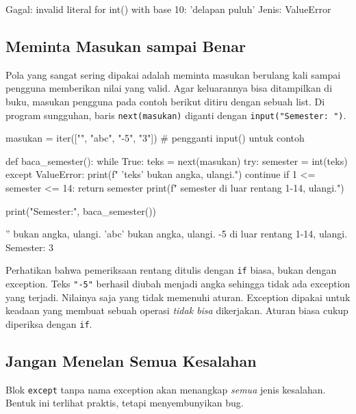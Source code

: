\begin{keluaran}
Gagal: invalid literal for int() with base 10: 'delapan puluh'
Jenis: ValueError
\end{keluaran}

\subsection{Meminta Masukan sampai Benar}

Pola yang sangat sering dipakai adalah meminta masukan berulang kali sampai pengguna memberikan nilai yang valid. Agar keluarannya bisa ditampilkan di buku, masukan pengguna pada contoh berikut ditiru dengan sebuah list. Di program sungguhan, baris \texttt{next(masukan)} diganti dengan \texttt{input("Semester: ")}.

\begin{kode}
masukan = iter(["", "abc", "-5", "3"])     # pengganti input() untuk contoh

def baca_semester():
    while True:
        teks = next(masukan)
        try:
            semester = int(teks)
        except ValueError:
            print(f"  '{teks}' bukan angka, ulangi.")
            continue
        if 1 <= semester <= 14:
            return semester
        print(f"  {semester} di luar rentang 1-14, ulangi.")

print("Semester:", baca_semester())
\end{kode}

\begin{keluaran}
  '' bukan angka, ulangi.
  'abc' bukan angka, ulangi.
  -5 di luar rentang 1-14, ulangi.
Semester: 3
\end{keluaran}

Perhatikan bahwa pemeriksaan rentang ditulis dengan \texttt{if} biasa, bukan dengan exception. Teks \texttt{"-5"} berhasil diubah menjadi angka sehingga tidak ada exception yang terjadi. Nilainya saja yang tidak memenuhi aturan. Exception dipakai untuk keadaan yang membuat sebuah operasi \emph{tidak bisa} dikerjakan. Aturan biasa cukup diperiksa dengan \texttt{if}.

\subsection{Jangan Menelan Semua Kesalahan}

Blok \texttt{except} tanpa nama exception akan menangkap \emph{semua} jenis kesalahan. Bentuk ini terlihat praktis, tetapi menyembunyikan bug.

